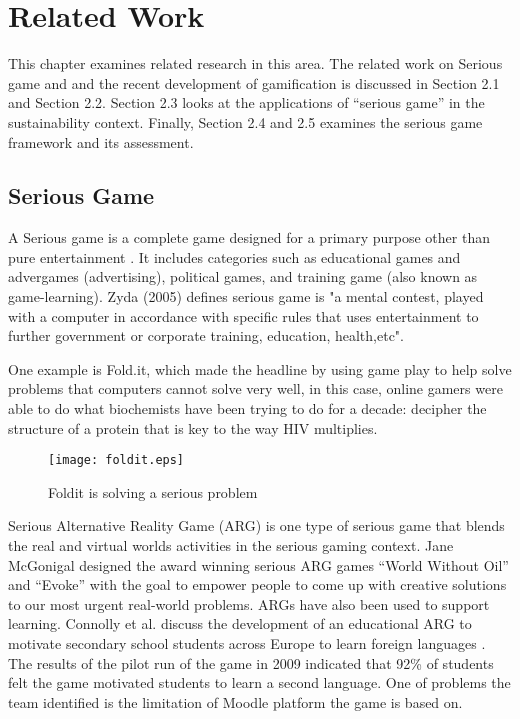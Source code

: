 \chapter{Related Work}
\label{cha:related-work}

This chapter examines related research in this area. The related work on Serious game and and the recent development of gamification is discussed in Section 2.1 and Section 2.2. Section 2.3 looks at the applications of ``serious game'' in the sustainability context. Finally, Section 2.4 and 2.5 examines the serious game framework and its assessment.

\section {Serious Game}
A Serious game is a complete game designed for a primary purpose other than pure entertainment \cite {WikipediaSeriousGame}. It includes categories such as educational games and advergames (advertising), political games, and training game (also known as game-learning). Zyda (2005) defines serious game is "a mental contest, played with a computer in accordance with specific rules that uses entertainment to further government or corporate training, education, health,etc".

One example is Fold.it, which made the headline \cite {khatib2011crystal} by using game play to help solve problems that computers cannot solve very well, in this case, online gamers were able to do what biochemists have been trying to do for a decade: decipher the structure of a protein that is key to the way HIV multiplies.

\begin{figure}[htbp]
	\centering
		\texttt{[image: foldit.eps]}
		\caption{Foldit is solving a serious problem}
		\label{fig:foldit}
\end{figure}

Serious Alternative Reality Game (ARG) is one type of serious game that blends the real and virtual worlds activities in the serious gaming context.
Jane McGonigal designed the award winning serious ARG games 
``World Without Oil'' \cite{worldwithoutoil} and ``Evoke''
\cite{urgentevoke} with the goal to empower people to come up with creative
solutions to our most urgent real-world problems. ARGs have also been used to
support learning. Connolly et al. discuss the development of an educational ARG
to motivate secondary school students across Europe to learn foreign languages
\cite{connolly2009arguing}. The results of the pilot run of the game in 2009
indicated that 92\% of students felt the game motivated students to learn a
second language. One of problems the team identified is the limitation of
Moodle platform the game is based on.

